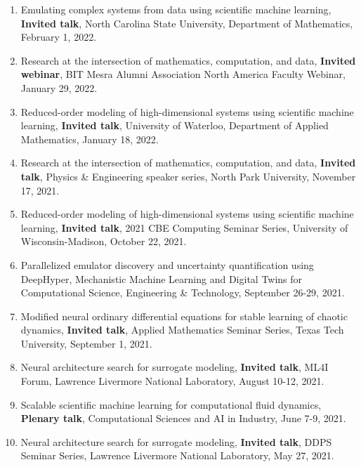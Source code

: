 \documentclass[letterpaper]{article}
\begin{document}
\begin{enumerate}
\item Emulating complex systems from data using scientific machine learning, \textbf{Invited talk}, North Carolina State University, Department of Mathematics, February 1, 2022.

\item Research at the intersection of mathematics, computation, and data, \textbf{Invited webinar}, BIT Mesra Alumni Association North America Faculty Webinar, January 29, 2022.

\item Reduced-order modeling of high-dimensional systems using scientific machine learning, \textbf{Invited talk}, University of Waterloo, Department of Applied Mathematics, January 18, 2022.

\item Research at the intersection of mathematics, computation, and data, \textbf{Invited talk}, Physics \& Engineering speaker series, North Park University, November 17, 2021.

\item Reduced-order modeling of high-dimensional systems using scientific machine learning, \textbf{Invited talk}, 2021 CBE Computing Seminar Series, University of Wisconsin-Madison, October 22, 2021.

\item Parallelized emulator discovery and uncertainty quantification using DeepHyper, Mechanistic Machine Learning and Digital Twins for Computational Science, Engineering \& Technology, September 26-29, 2021.

\item Modified neural ordinary differential equations for stable learning of chaotic dynamics, \textbf{Invited talk}, Applied Mathematics Seminar Series, Texas Tech University, September 1, 2021.

\item Neural architecture search for surrogate modeling, \textbf{Invited talk}, ML4I Forum, Lawrence Livermore National Laboratory, August 10-12, 2021.

\item Scalable scientific machine learning for computational fluid dynamics, \textbf{Plenary talk}, Computational Sciences and AI in Industry, June 7-9, 2021.

\item Neural architecture search for surrogate modeling, \textbf{Invited talk}, DDPS Seminar Series, Lawrence Livermore National Laboratory, May 27, 2021.


\end{enumerate}
\end{document}
